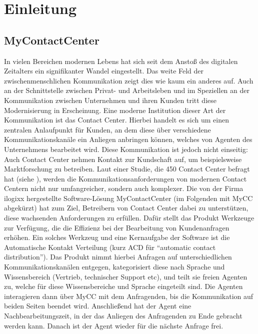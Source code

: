 \chapter{Einleitung}
\label{chap:Einleitung}

\section{MyContactCenter}
\label{sec:MyContactCenter}
In vielen Bereichen modernen Lebens hat sich seit dem Anstoß des digitalen Zeitalters ein signifikanter Wandel eingestellt. Das weite Feld  der zwischenmenschlichen Kommunikation zeigt dies wie kaum ein anderes auf. Auch an der Schnittstelle zwischen Privat- und Arbeitsleben und im Speziellen an der Kommunikation zwischen Unternehmen und ihren Kunden tritt diese Modernisierung in Erscheinung. Eine moderne Institution dieser Art der Kommunikation ist das Contact Center. Hierbei handelt es sich um einen zentralen Anlaufpunkt für Kunden, an dem diese über verschiedene Kommunikationskanäle ein Anliegen anbringen können, welches von Agenten des Unternehmens bearbeitet wird. Diese Kommunikation ist jedoch nicht einseitig: Auch Contact Center nehmen Kontakt zur Kundschaft auf, um beispielsweise Marktforschung zu betreiben. 
\newline
Laut einer Studie, die 450 Contact Center befragt hat (siehe \cite{Deloitte:17}), werden die Kommunikationsanforderungen von modernen Contact Centern nicht nur umfangreicher, sondern auch komplexer. Die von der Firma ilogixx hergestellte Software-Lösung MyContactCenter (im Folgenden mit MyCC abgekürzt) hat zum Ziel, Betreibern von Contact Center dabei zu unterstützen, diese wachsenden Anforderungen zu erfüllen. Dafür stellt das Produkt Werkzeuge zur Verfügung, die die Effizienz bei der Bearbeitung von Kundenanfragen erhöhen. Ein solches Werkzeug und eine Kernaufgabe der Software ist die Automatische Kontakt Verteilung (kurz ACD für ``automatic contact distribution''). Das Produkt nimmt hierbei Anfragen auf unterschiedlichen Kommunikationskanälen entgegen, kategorisiert diese nach Sprache und Wissensbereich (Vertrieb, technischer Support etc), und teilt sie freien Agenten zu, welche für diese Wissensbereiche und Sprache eingeteilt sind. Die Agenten interagieren dann über MyCC mit dem Anfragenden, bis die Kommunikation auf beiden Seiten beendet wird. Anschließend hat der Agent eine Nachbearbeitungszeit, in der das Anliegen des Anfragenden zu Ende gebracht werden kann. Danach ist der Agent wieder für die nächste Anfrage frei.
\newline
